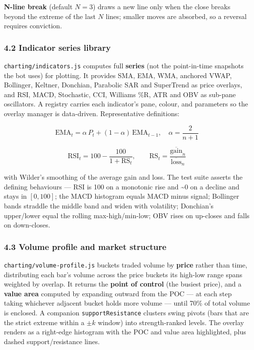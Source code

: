 \documentclass[
  11pt,
]{article}
\begin{document}
\textbf{N-line break} (default \(N=3\)) draws a new line only when the
close breaks beyond the extreme of the last \(N\) lines; smaller moves
are absorbed, so a reversal requires conviction.

\subsubsection{4.2 Indicator series
library}\label{indicator-series-library}

\texttt{charting/indicators.js} computes full \textbf{series} (not the
point-in-time snapshots the bot uses) for plotting. It provides SMA,
EMA, WMA, anchored VWAP, Bollinger, Keltner, Donchian, Parabolic SAR and
SuperTrend as price overlays, and RSI, MACD, Stochastic, CCI, Williams
\%R, ATR and OBV as sub-pane oscillators. A registry carries each
indicator's pane, colour, and parameters so the overlay manager is
data-driven. Representative definitions:

\[
\text{EMA}_t = \alpha\,P_t + (1-\alpha)\,\text{EMA}_{t-1},\quad \alpha = \frac{2}{n+1}
\]

\[
\text{RSI}_t = 100 - \frac{100}{1 + \text{RS}_t},\qquad
\text{RS}_t = \frac{\overline{\text{gain}}_n}{\overline{\text{loss}}_n}
\]

with Wilder's smoothing of the average gain and loss. The test suite
asserts the defining behaviours --- RSI is 100 on a monotonic rise and
\textasciitilde0 on a decline and stays in \([0,100]\); the MACD
histogram equals MACD minus signal; Bollinger bands straddle the middle
band and widen with volatility; Donchian's upper/lower equal the rolling
max-high/min-low; OBV rises on up-closes and falls on down-closes.

\subsubsection{4.3 Volume profile and market
structure}\label{volume-profile-and-market-structure}

\texttt{charting/volume-profile.js} buckets traded volume by
\textbf{price} rather than time, distributing each bar's volume across
the price buckets its high-low range spans weighted by overlap. It
returns the \textbf{point of control} (the busiest price), and a
\textbf{value area} computed by expanding outward from the POC --- at
each step taking whichever adjacent bucket holds more volume --- until
70\% of total volume is enclosed. A companion \texttt{supportResistance}
clusters swing pivots (bars that are the strict extreme within a
\(\pm k\) window) into strength-ranked levels. The overlay renders as a
right-edge histogram with the POC and value area highlighted, plus
dashed support/resistance lines.
\end{document}
